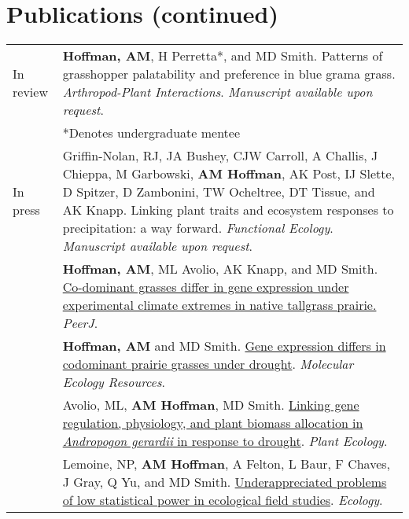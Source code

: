 \documentclass[letterpaper]{deedy-resume} %
\begin{document}
\section{Publications (continued)}
\begin{tabular}{>{\raggedleft\arraybackslash}p{2cm}p{16cm}}


In review & \textbf{Hoffman, AM}, H Perretta*, and MD Smith. Patterns of grasshopper palatability and preference in blue grama grass. \textcolor{special}{\textit{Arthropod-Plant Interactions}}. \textit{Manuscript available upon request}.\\

&*Denotes undergraduate mentee\\

In press & Griffin-Nolan, RJ, JA Bushey, CJW Carroll, A Challis, J Chieppa, M Garbowski, \textbf{AM Hoffman}, AK Post, IJ Slette, D Spitzer, D Zambonini, TW Ocheltree, DT Tissue, and AK Knapp. Linking plant traits and ecosystem responses to precipitation: a way forward. \textcolor{special}{\textit{Functional Ecology}}. \textit{Manuscript available upon request}.\\

2018 & \textbf{Hoffman, AM}, ML Avolio, AK Knapp, and MD Smith. \href{https://peerj.com/articles/4394.pdf}{Co-dominant grasses differ in gene expression under experimental climate extremes in native tallgrass prairie.} \textcolor{special}{\textit{PeerJ}}.\\

2017 & \textbf{Hoffman, AM} and MD Smith. \href{http://onlinelibrary.wiley.com/doi/10.1111/1755-0998.12733/full}{Gene expression differs in codominant prairie grasses under drought}. \textcolor{special}{\textit{Molecular Ecology Resources}}.\\

2017 & Avolio, ML, \textbf{AM Hoffman}, MD Smith. \href{https://link.springer.com/article/10.1007/s11258-017-0773-3}{Linking gene regulation, physiology, and plant biomass allocation in \textit{Andropogon gerardii} in response to drought}. \textcolor{special}{\textit{Plant Ecology}}. \\

2016 & Lemoine, NP, \textbf{AM Hoffman}, A Felton, L Baur, F Chaves, J Gray, Q Yu, and MD Smith. \href{http://onlinelibrary.wiley.com/doi/10.1002/ecy.1506/full}{Underappreciated problems of low statistical power in ecological field studies}. \textcolor{special}{\textit{Ecology}}. \\


\end{tabular}
\end{document}
